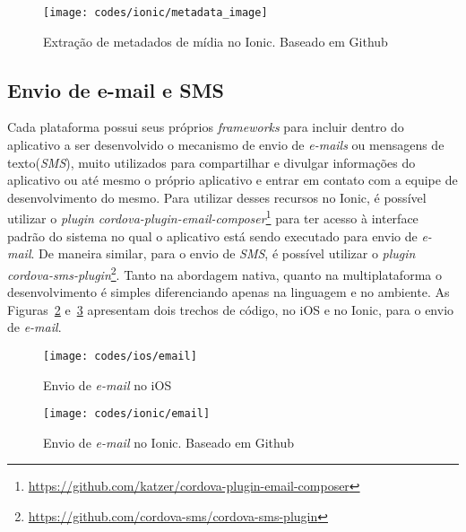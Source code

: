 \begin{figure}[H]
	\centering
	\texttt{[image: codes/ionic/metadata\_image]}
	\caption[Extração de metadados de mídia no Ionic]{Extração de metadados de mídia no Ionic. Baseado em Github\protect\footnotemark}
	\label{fig:metadata_image-ionic}
\end{figure}

\subsection{Envio de e-mail e SMS} \label{subsec:emailsms}
Cada plataforma possui seus próprios \textit{frameworks} para incluir dentro do aplicativo a ser desenvolvido o mecanismo de envio de \textit{e-mails} ou mensagens de texto(\textit{SMS}), muito utilizados para compartilhar 
e divulgar informações do aplicativo ou até mesmo o próprio aplicativo e entrar em contato com a equipe de desenvolvimento do mesmo. Para utilizar desses recursos no Ionic, é possível utilizar o 
\textit{plugin cordova-plugin-email-composer}\footnote{\url{https://github.com/katzer/cordova-plugin-email-composer}} para ter acesso à interface padrão do sistema no qual o aplicativo está sendo executado para envio de 
\textit{e-mail}. De maneira similar, para o envio de \textit{SMS}, é possível utilizar o \textit{plugin cordova-sms-plugin}\footnote{\url{https://github.com/cordova-sms/cordova-sms-plugin}}. Tanto na abordagem nativa, 
quanto na multiplataforma o desenvolvimento é simples diferenciando apenas na linguagem e no ambiente. As Figuras~\ref{fig:email-ios} e~\ref{fig:email-ionic} apresentam dois trechos de código, no iOS e no Ionic, 
para o envio de \textit{e-mail}.
\begin{figure}[H]
	\centering
	\texttt{[image: codes/ios/email]}
	\caption[Envio de \textit{e-mail} no iOS]{Envio de \textit{e-mail} no iOS}
	\label{fig:email-ios}
\end{figure}
\begin{figure}[H]
	\centering
	\texttt{[image: codes/ionic/email]}
	\caption[Envio de \textit{e-mail} no Ionic]{Envio de \textit{e-mail} no Ionic. Baseado em Github\protect\footnotemark}
	\label{fig:email-ionic}
\end{figure}

